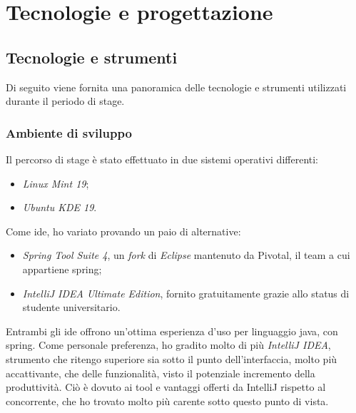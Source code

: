 
\chapter{Tecnologie e progettazione}
\label{cap:progettazione-codifica}


\section{Tecnologie e strumenti}
\label{sec:tecnologie-strumenti}

Di seguito viene fornita una panoramica delle tecnologie e strumenti utilizzati durante il periodo di stage.


\subsection{Ambiente di sviluppo}
Il percorso di stage è stato effettuato in due sistemi operativi differenti:
\begin{itemize}
	\item \textit{Linux Mint 19};
	\item \textit{Ubuntu KDE 19}.
\end{itemize}

Come \acrshort{ide}, ho variato provando un paio di alternative:
\begin{itemize}
	\item \textit{Spring Tool Suite 4}, un \textit{fork} di \textit{Eclipse} mantenuto da Pivotal, il team a cui appartiene \gls{spring};
	\item \textit{IntelliJ IDEA Ultimate Edition}, fornito gratuitamente grazie allo status di studente universitario.
\end{itemize} 

Entrambi gli \acrshort{ide} offrono un'ottima esperienza d'uso per linguaggio \gls{java}, con \gls{spring}.
Come personale preferenza, ho gradito molto di più \textit{IntelliJ IDEA}, strumento che ritengo superiore sia sotto il punto dell'interfaccia, molto più accattivante, che delle funzionalità, visto il potenziale incremento della produttività. Ciò è dovuto ai tool e vantaggi offerti da IntelliJ rispetto al concorrente, che ho trovato molto più carente sotto questo punto di vista.

